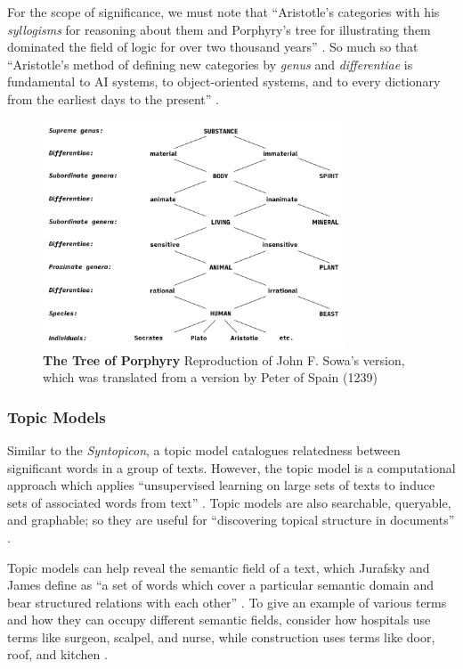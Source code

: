 For the scope of significance, we must note that “Aristotle’s categories with his \textit{syllogisms} for reasoning about them and Porphyry's tree for illustrating them dominated the field of logic for over two thousand years” \citep[p. 2]{sowa_relating_1993}.  So much so that “Aristotle’s method of defining new categories by \textit{genus} and \textit{differentiae} is fundamental to AI systems, to object-oriented systems, and to every dictionary from the earliest days to the present” \citep[p. 4]{sowa_knowledge_2000}.

\FloatBarrier
\begin{figure}[h]
    \centering
    \includegraphics[width=0.8\textwidth]{figures/f11.png}
    \caption[The Tree of Porphyry]{\textbf{The Tree of Porphyry} 
Reproduction of John F. Sowa’s version, which was translated from a version by Peter of Spain (1239) \citep[p. 5]{sowa_knowledge_2000} }
    \label{fig:11}
\end{figure}
\FloatBarrier
{}

\subsubsection{Topic Models}
Similar to the \textit{Syntopicon}\citep{adler_great_1952-2}, a topic model catalogues relatedness between significant words in a group of texts. However, the topic model is a computational approach which applies “unsupervised learning on large sets of texts to induce sets of associated words from text” \citep[p. 108]{jurafsky_speech_2024}. Topic models are also searchable, queryable, and graphable; so they are useful for “discovering topical structure in documents” \citep[p. 108]{jurafsky_speech_2024}.

Topic models can help reveal the semantic field of a text, which Jurafsky and James define as “a set of words which cover a particular semantic domain and bear structured relations with each other” \citep[p. 107]{jurafsky_speech_2024}. To give an example of various terms and how they can occupy different semantic fields, consider how hospitals use terms like surgeon, scalpel, and nurse, while construction uses terms like door, roof, and kitchen \citep[p. 107]{jurafsky_speech_2024}.
